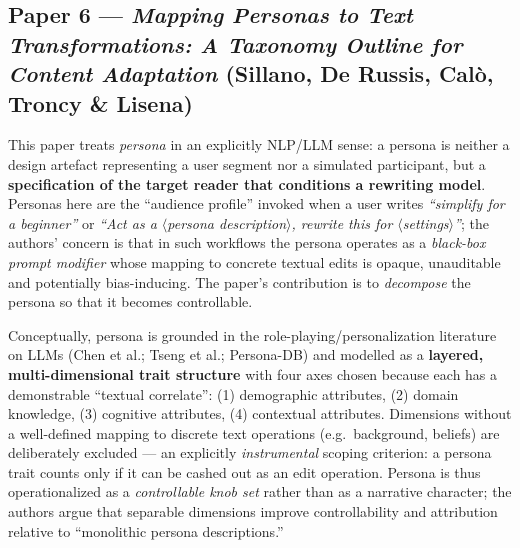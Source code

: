 
\subsection*{Paper 6 --- \textit{Mapping Personas to Text Transformations: A Taxonomy Outline for Content Adaptation} (Sillano, De Russis, Cal\`o, Troncy \& Lisena)}

This paper treats \emph{persona} in an explicitly NLP/LLM sense: a persona is neither a design artefact representing a user segment nor a simulated participant, but a \textbf{specification of the target reader that conditions a rewriting model}. Personas here are the ``audience profile'' invoked when a user writes \textit{``simplify for a beginner''} or \textit{``Act as a $\langle$persona description$\rangle$, rewrite this for $\langle$settings$\rangle$''}; the authors' concern is that in such workflows the persona operates as a \emph{black-box prompt modifier} whose mapping to concrete textual edits is opaque, unauditable and potentially bias-inducing. The paper's contribution is to \emph{decompose} the persona so that it becomes controllable.

Conceptually, persona is grounded in the role-playing/personalization literature on LLMs (Chen et al.; Tseng et al.; Persona-DB) and modelled as a \textbf{layered, multi-dimensional trait structure} with four axes chosen because each has a demonstrable ``textual correlate'': (1) demographic attributes, (2) domain knowledge, (3) cognitive attributes, (4) contextual attributes. Dimensions without a well-defined mapping to discrete text operations (e.g.\ background, beliefs) are deliberately excluded --- an explicitly \emph{instrumental} scoping criterion: a persona trait counts only if it can be cashed out as an edit operation. Persona is thus operationalized as a \emph{controllable knob set} rather than as a narrative character; the authors argue that separable dimensions improve controllability and attribution relative to ``monolithic persona descriptions.''

